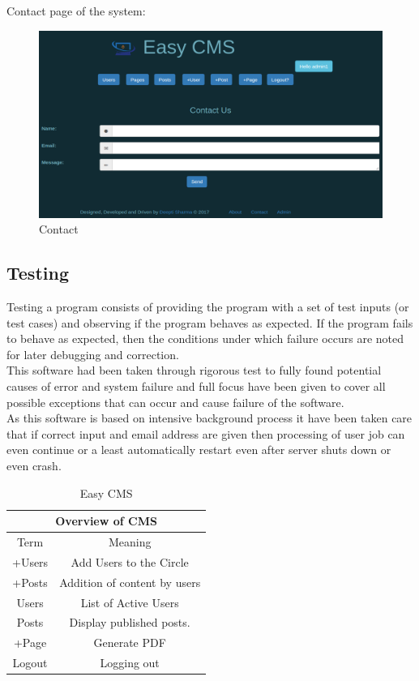Contact page of the system: \\
\begin{figure}[!ht]
	\centering
	\includegraphics[scale=0.45]{input/images/contact.png}                
	\caption{Contact}
	\hspace{-1.5em}
\end{figure}
\newpage
\subsection{Testing}
Testing a program consists of providing the program with a set of test inputs (or test cases) and
observing if the program behaves as expected. If the program fails to behave as expected, then the
conditions under which failure occurs are noted for later debugging and correction. \\
This software had been taken through rigorous test to fully found potential causes of error and system failure
and full focus have been given to cover all possible exceptions that can 
occur and cause failure of the software.\\
As this software is based on intensive background process it have been taken care that 
if correct input and email address are given then processing of user job can even continue or a least automatically 
restart even after server shuts down or even crash.

\begin{table}[h]
\centering
\begin{tabular}{ ||c|c|| }
\hline
 \multicolumn{2}{||c||}{Overview of CMS} \\
 \hline
 Term & Meaning \\ [0.5ex] 
 \hline \hline
	+Users & Add Users to the Circle \\ \hline
	+Posts & Addition of content by users \\ \hline
	Users & List of Active Users\\ \hline
	Posts & Display published posts. \\ \hline
	+Page & Generate PDF \\ \hline
	Logout &  Logging out        \\ \hline
	
\end{tabular}
\caption{Easy CMS}
\label{table2}
\end{table}

